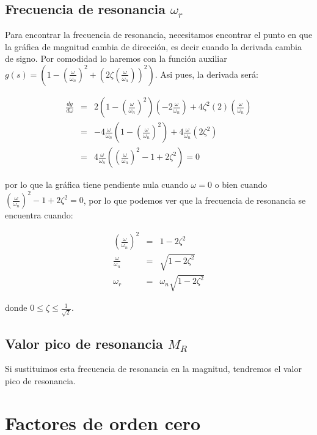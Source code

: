         \subsection{Frecuencia de resonancia $\omega_r$}

            Para encontrar la frecuencia de resonancia, necesitamos encontrar el punto en que la gráfica de magnitud cambia de dirección, es decir cuando la derivada cambia de signo. Por comodidad lo haremos con la función auxiliar $g(s) = \left( 1 - \left( \frac{\omega}{\omega_n} \right)^2 + \left( 2 \zeta \left( \frac{\omega}{\omega_n} \right) \right)^2 \right)$. Asi pues, la derivada será:

            \begin{eqnarray*}
                \frac{d g}{d \omega} & = & 2 \left( 1 - \left( \frac{\omega}{\omega_n} \right)^2 \right) \left( -2 \frac{\omega}{\omega_n} \right) + 4 \zeta^2 (2) \left( \frac{\omega}{\omega_n} \right) \\
                & = & -4 \frac{\omega}{\omega_n} \left( 1 - \left( \frac{\omega}{\omega_n} \right)^2 \right) + 4 \frac{\omega}{\omega_n} \left( 2 \zeta^2 \right) \\
                & = & 4 \frac{\omega}{\omega_n} \left( \left( \frac{\omega}{\omega_n} \right)^2 - 1 + 2 \zeta^2 \right) = 0
            \end{eqnarray*}

            por lo que la gráfica tiene pendiente nula cuando $\omega = 0$ o bien cuando $\left( \frac{\omega}{\omega_n} \right)^2 - 1 + 2 \zeta^2 = 0$, por lo que podemos ver que la frecuencia de resonancia se encuentra cuando:

            \begin{eqnarray*}
                \left( \frac{\omega}{\omega_n} \right)^2 & = & 1 - 2 \zeta^2 \\
                \frac{\omega}{\omega_n} & = & \sqrt{1 - 2 \zeta^2} \\
                \omega_r & = & \omega_n \sqrt{1 - 2 \zeta^2}
            \end{eqnarray*}

            donde $0 \le \zeta \le \frac{1}{\sqrt{2}}$.

        \subsection{Valor pico de resonancia $M_R$}

            Si sustituimos esta frecuencia de resonancia en la magnitud, tendremos el valor pico de resonancia.

    \newpage
    \section{Factores de orden cero}
